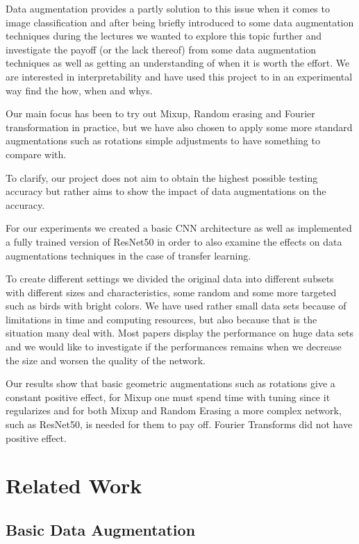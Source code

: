\documentclass{article}
\begin{document}
Data augmentation provides a partly solution to this issue when it comes to image classification and after being briefly introduced to some data augmentation techniques during the lectures we wanted to explore this topic further and investigate the payoff (or the lack thereof) from some data augmentation techniques as well as getting an understanding of when it is worth the effort. We are interested in interpretability and have used this project to in an experimental way find the how, when and whys. 

Our main focus has been to try out Mixup, Random erasing and Fourier transformation in practice, but we have also chosen to apply some more standard augmentations such as rotations simple adjustments to have something to compare with.

To clarify, our project does not aim to obtain the highest possible testing accuracy but rather aims to show the impact of data augmentations 
on the accuracy. 

For our experiments we created a basic CNN architecture as well as implemented a fully trained version of ResNet50 in order to also examine the effects on data augmentations techniques in the case of transfer learning.

To create different settings we divided the original data into different subsets with different sizes and characteristics, some random and some more targeted such as birds with bright colors. We have used rather small data sets because of limitations in time and computing resources, but also because that is the situation many deal with. Most papers display the performance on huge data sets and we would like to investigate if the performances remains when we decrease the size and worsen the quality of the network.

Our results show that basic geometric augmentations such as rotations give a constant positive effect, for Mixup one must spend time with tuning since it regularizes and for both Mixup and Random Erasing a more complex network, such as ResNet50, is needed for them to pay off. Fourier Transforms did not have positive effect. 



\section{Related Work}

\subsection{Basic Data Augmentation}
\end{document}
